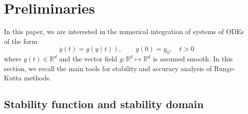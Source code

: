 \documentclass[10pt,a4paper]{article}
\begin{document}
        \section{Preliminaries}
\label{sec:pre}
In this paper, we are interested in the numerical integration of systems of ODEs of the form 
\begin{equation}\label{eq:ode}
		\dot y(t)=g(y(t)),\qquad y(0)=y_0, \quad 
t>0	\end{equation}
where $y(t) \in \mathbb{R}^{d}$ and the vector field $g: \mathbb{R}^{d} \mapsto \mathbb{R}^{d}$ is assumed smooth.  In this section, we recall the main tools for stability and accuracy analysis of Runge-Kutta methods.

        
        
        \subsection{Stability function and stability domain}
        
\end{document}
